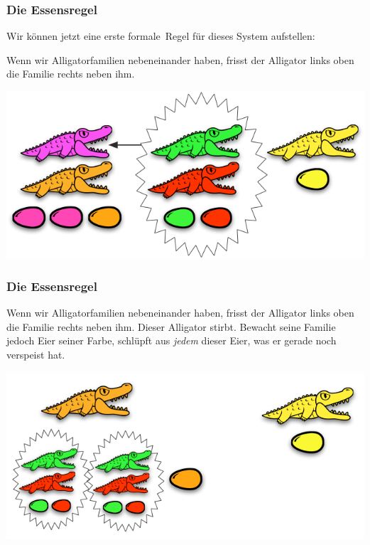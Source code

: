 \documentclass{beamer}
\begin{document}

\begin{frame}
\frametitle{Die Essensregel}

Wir können jetzt eine erste \glqq formale\grqq\ Regel für dieses System aufstellen:\bigskip

Wenn wir Alligatorfamilien nebeneinander haben, frisst der Alligator links oben die Familie rechts neben ihm.\bigskip

\begin{center}
\includegraphics[scale=0.35]{eatingrule_2.png} 
\end{center}

\end{frame}


\begin{frame}
\frametitle{Die Essensregel}

Wenn wir Alligatorfamilien nebeneinander haben, frisst der Alligator links oben die Familie rechts neben ihm. Dieser Alligator stirbt. Bewacht seine Familie jedoch Eier seiner Farbe, schlüpft aus \emph{jedem} dieser Eier, was er gerade noch verspeist hat.

\begin{center}
\includegraphics[scale=0.4]{eatingrule_3.png} 
\end{center}

\end{frame}
\end{document}
